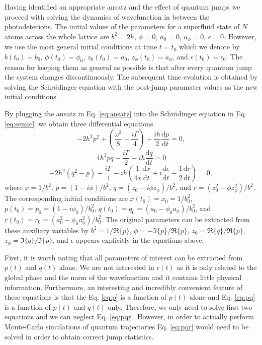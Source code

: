 Having identified an appropriate ansatz and the effect of quantum
jumps we proceed with solving the dynamics of wavefunction in between
the photodetecions. The initial values of the parameters for a
superfluid state of $N$ atoms across the whole lattice are $b^2 = 2h$,
$\phi =0$, $a_0 = 0$, $a_\phi = 0$, $\epsilon = 0$. However, we use
the most general initial conditions at time $t = t_0$ which we denote
by $b(t_0) = b_0$, $\phi(t_0) = \phi_0$, $z_0(t_0) = a_0$,
$z_\phi(t_0) = a_\phi$, and $\epsilon(t_0) = \epsilon_0$. The reason
for keeping them as general as possible is that after every quantum
jump the system changes discontinuously. The subsequent time evolution
is obtained by solving the Schr\"{o}dinger equation with the post-jump
paramater values as the new initial conditions.

By plugging the ansatz in Eq. \eqref{eq:ansatz} into the
Schr\"{o}dinger equation in Eq. \eqref{eq:semicl} we obtain three
differential equations
\begin{equation}
  \label{eq:p}
  -2 h^2 p^2 + \left( \frac{ \omega^2 } { 8 } - \frac{ i \Gamma } { 4
    } \right) + \frac{ i h } { 2 } \frac{ \mathrm{d} p } { \mathrm{d}
    t } = 0,
\end{equation}
\begin{equation}
  \label{eq:pq}
  4 h^2 p q - \frac{ i \Gamma } { 2 } - i h \frac{ \mathrm{d} q } {
    \mathrm{d} t } = 0
\end{equation}
\begin{equation}
  \label{eq:pqr}
  -2 h^2 (q^2 - p) - \frac{ i \Gamma } { 4 } - i h \left( \frac{ 1 } {
      4 x } \frac{ \mathrm{d} x } {\mathrm{d} t } + i \frac{
      \mathrm{d} \epsilon } { \mathrm{d} t } - \frac{1}{2} \frac{
      \mathrm{d} r } { \mathrm{d} t } \right) = 0,
\end{equation}
where $x = 1/b^2$, $p = (1 - i \phi)/b^2$,
$q = (z_0 - i \phi z_\phi)/b^2$, and
$r = (z_0^2 - \phi z_\phi^2)/b^2$. The corresponding initial
conditions are $x(t_0) = x_0 = 1/b_0^2$,
$p(t_0) = p_0 = (1 - i \phi_0)/b_0^2$,
$q(t_0) = q_0 = (a_0 - \phi_0 a_\phi)/b_0^2$, and
$r(t_0) = r_0 = (a_0^2 - \phi_0 a_\phi^2)/b_0^2$. The original
parameters can be extracted from these auxiliary variables by
$b^2 = 1 / \Re \{ p \}$, $\phi = - \Im \{ p \} / \Re \{ p \}$,
$z_0 = \Re \{ q \} / \Re \{ p \}$,
$z_\phi = \Im \{ q \} / \Im \{ p \}$, and $\epsilon$ appears
explicitly in the equations above.

First, it is worth noting that all parameters of interest can be
extracted from $p(t)$ and $q(t)$ alone. We are not interested in
$\epsilon(t)$ as it is only related to the global phase and the norm
of the wavefunction and it contains little physical
information. Furthermore, an interesting and incredibly convenient
feature of these equations is that the Eq. \eqref{eq:p} is a function
of $p(t)$ alone and Eq. \eqref{eq:pq} is a function of $p(t)$ and
$q(t)$ only. Therefore, we only need to solve first two equations and
we can neglect Eq. \eqref{eq:pqr}. However, in order to actually
perform Monte-Carlo simulations of quantum trajectories
Eq. \eqref{eq:pqr} would need to be solved in order to obtain correct
jump statistics.

